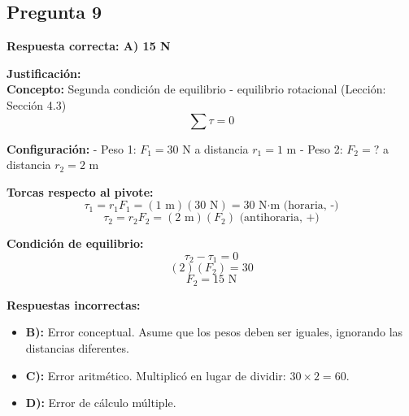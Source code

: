 \newpage
\begin{respuestabox}
\subsection{Pregunta 9}
\textcolor{verdecorrecto}{\textbf{Respuesta correcta: A) 15 N}}

\textbf{Justificación:}\\
\textbf{Concepto:} Segunda condición de equilibrio - equilibrio rotacional (Lección: Sección 4.3)
$$\sum \tau = 0$$

\textbf{Configuración:}
- Peso 1: $F_1 = 30$ N a distancia $r_1 = 1$ m
- Peso 2: $F_2 = ?$ a distancia $r_2 = 2$ m

\textbf{Torcas respecto al pivote:}
$$\tau_1 = r_1 F_1 = (1 \text{ m})(30 \text{ N}) = 30 \text{ N·m (horaria, -)}$$
$$\tau_2 = r_2 F_2 = (2 \text{ m})(F_2) \text{ (antihoraria, +)}$$

\textbf{Condición de equilibrio:}
$$\tau_2 - \tau_1 = 0$$
$$(2)(F_2) = 30$$
$$F_2 = 15 \text{ N}$$

\textbf{Respuestas incorrectas:}
\begin{itemize}
    \item \textbf{B):} Error conceptual. Asume que los pesos deben ser iguales, ignorando las distancias diferentes.
    \item \textbf{C):} Error aritmético. Multiplicó en lugar de dividir: $30 \times 2 = 60$.
    \item \textbf{D):} Error de cálculo múltiple.
\end{itemize}
\end{respuestabox}

